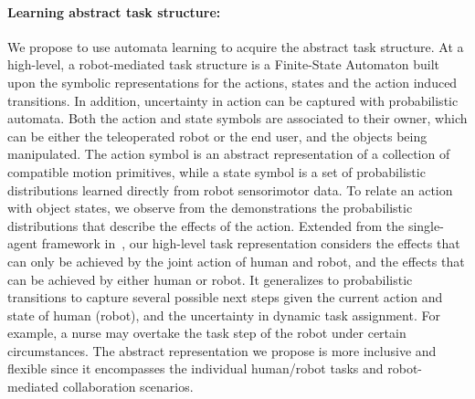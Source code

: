 \documentclass[letterpaper, 11 pt, onecolumn]{article}
\begin{document}
 \paragraph*{Learning abstract task structure:} We propose to use automata learning to acquire the abstract task structure. At a high-level, a robot-mediated task structure is a Finite-State Automaton built upon the symbolic representations for the actions, states and the action induced transitions. In addition, uncertainty in action can be captured with probabilistic automata. 
Both the action and state symbols are associated to their owner, which can be either the teleoperated robot or the end user, and the objects being manipulated. The action symbol is an abstract representation of a collection of compatible motion primitives, while a state symbol is a set of probabilistic distributions learned directly from robot sensorimotor data. To relate an action with object states, we observe from the demonstrations the probabilistic distributions that describe the effects of the action. Extended from the single-agent framework in~\cite{konidaris2018skills}, our high-level task representation considers the effects that can only be achieved by the joint action of human and robot, and the effects that can be achieved by either human or robot. It generalizes to probabilistic transitions to capture several possible next steps given the current action and state of human (robot), and the uncertainty in dynamic task assignment. For example, a nurse may overtake the task step of the robot under certain circumstances. The abstract representation we propose is more inclusive and flexible since it encompasses the individual human/robot tasks and robot-mediated collaboration scenarios. 
\end{document}
